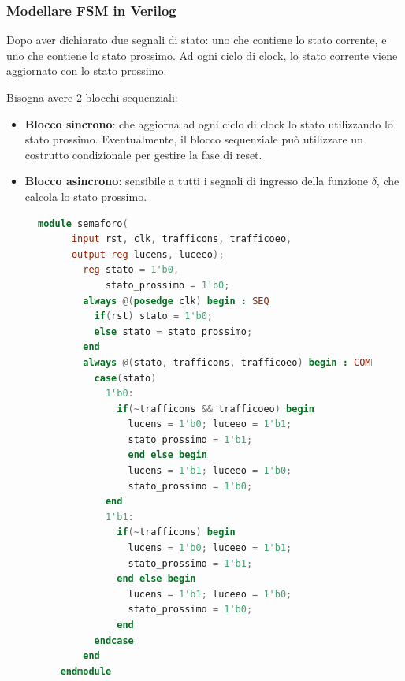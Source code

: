 \documentclass[a4paper]{article}
\theoremstyle{break}
\theoremstyle{break}
\theoremstyle{break}
\theoremstyle{break}
\begin{document}
\subsubsection{Modellare FSM in Verilog}
Dopo aver dichiarato due segnali di stato: uno che contiene lo stato
corrente, e uno che contiene lo stato prossimo. Ad ogni ciclo di clock, lo
stato corrente viene aggiornato con lo stato prossimo.

Bisogna avere 2 blocchi sequenziali:
\begin{itemize}
  \item \textbf{Blocco sincrono}: che aggiorna ad ogni ciclo di clock lo stato utilizzando
    lo stato prossimo. Eventualmente, il blocco sequenziale può utilizzare un
    costrutto condizionale per gestire la fase di reset.
  \item \textbf{Blocco asincrono}: sensibile a tutti i segnali di ingresso della funzione \( \delta \),
    che calcola lo stato prossimo.
\end{itemize}

\begin{figure}[H]
  \begin{lstlisting}[language=Verilog]
    module semaforo(
      input rst, clk, trafficons, trafficoeo,
      output reg lucens, luceeo);
        reg stato = 1'b0,
            stato_prossimo = 1'b0;
        always @(posedge clk) begin : SEQ
          if(rst) stato = 1'b0;
          else stato = stato_prossimo;
        end
        always @(stato, trafficons, trafficoeo) begin : COMB_OUT
          case(stato)
            1'b0:
              if(~trafficons && trafficoeo) begin
                lucens = 1'b0; luceeo = 1'b1;
                stato_prossimo = 1'b1;
                end else begin
                lucens = 1'b1; luceeo = 1'b0;
                stato_prossimo = 1'b0;
            end
            1'b1:
              if(~trafficons) begin
                lucens = 1'b0; luceeo = 1'b1;
                stato_prossimo = 1'b1;
              end else begin
                lucens = 1'b1; luceeo = 1'b0;
                stato_prossimo = 1'b0;
              end
          endcase
        end
    endmodule
  \end{lstlisting}
\end{figure}
\end{document}
